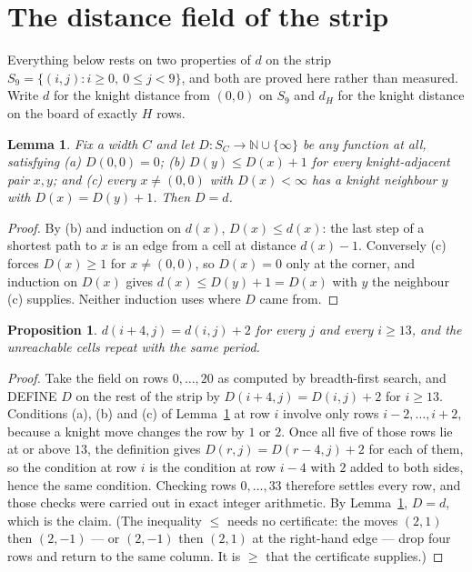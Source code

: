 \documentclass[11pt,a4paper]{article}
\theoremstyle{plain}
\newtheorem{lemma}[theorem]{Lemma}
\newtheorem{proposition}[theorem]{Proposition}
\theoremstyle{definition}
\begin{document}
\section{The distance field of the strip}

Everything below rests on two properties of $d$ on the strip $S_{9}=\{(i,j): i\ge 0,\ 0\le j<9\}$, and both are proved here rather than measured. Write $d$ for the knight distance from $(0,0)$ on $S_{9}$ and $d_H$ for the knight distance on the board of exactly $H$ rows.

\begin{lemma}\label{lem:bellman}
Fix a width $C$ and let $D:S_C\to\mathbb{N}\cup\{\infty\}$ be any function at all, satisfying
(a) $D(0,0)=0$; (b) $D(y)\le D(x)+1$ for every knight-adjacent pair $x,y$; and
(c) every $x\ne(0,0)$ with $D(x)<\infty$ has a knight neighbour $y$ with $D(x)=D(y)+1$. Then $D=d$.
\end{lemma}

\begin{proof}
By (b) and induction on $d(x)$, $D(x)\le d(x)$: the last step of a shortest path to $x$ is an edge from a cell at distance $d(x)-1$. Conversely (c) forces $D(x)\ge1$ for $x\ne(0,0)$, so $D(x)=0$ only at the corner, and induction on $D(x)$ gives $d(x)\le D(y)+1=D(x)$ with $y$ the neighbour (c) supplies. Neither induction uses where $D$ came from.
\end{proof}

\begin{proposition}\label{prop:period}
$d(i+4,j)=d(i,j)+2$ for every $j$ and every $i\ge13$, and the unreachable cells repeat with the same period.
\end{proposition}

\begin{proof}
Take the field on rows $0,\dots,20$ as computed by breadth-first search, and DEFINE $D$ on the rest of the strip by $D(i+4,j)=D(i,j)+2$ for $i\ge13$. Conditions (a), (b) and (c) of Lemma~\ref{lem:bellman} at row $i$ involve only rows $i-2,\dots,i+2$, because a knight move changes the row by $1$ or $2$. Once all five of those rows lie at or above $13$, the definition gives $D(r,j)=D(r-4,j)+2$ for each of them, so the condition at row $i$ is the condition at row $i-4$ with $2$ added to both sides, hence the same condition. Checking rows $0,\dots,33$ therefore settles every row, and those checks were carried out in exact integer arithmetic. By Lemma~\ref{lem:bellman}, $D=d$, which is the claim. (The inequality $\le$ needs no certificate: the moves $(2,1)$ then $(2,-1)$ --- or $(2,-1)$ then $(2,1)$ at the right-hand edge --- drop four rows and return to the same column. It is $\ge$ that the certificate supplies.)
\end{proof}
\end{document}
